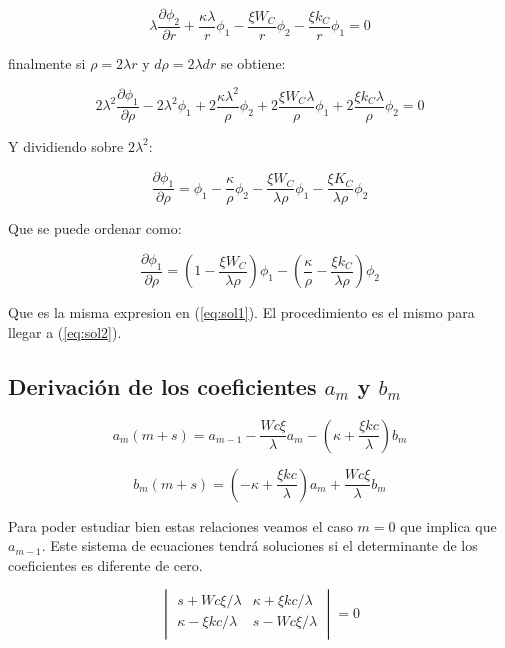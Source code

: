 \documentclass[a4paper, 12pt]{article} %
\begin{document}
\begin{equation}
\lambda \dfrac{\partial \phi_2}{\partial r}  + \dfrac{\kappa \lambda}{r} \phi_1  - \dfrac{\xi W_C}{r} \phi_2 - \dfrac{\xi k_C}{r} \phi_1 = 0
\end{equation}

finalmente si $\rho = 2\lambda r$ y $d\rho = 2 \lambda dr$ se obtiene:

\[
2\lambda^2 \dfrac{\partial \phi_1}{\partial \rho} - 2\lambda^2 \phi_1 + 2 \dfrac{\kappa \lambda^2 }{\rho} \phi_2 
+ 2 \dfrac{\xi W_C \lambda}{\rho}\phi_1 + 2\dfrac{\xi k_C \lambda }{\rho}\phi_2 = 0
\]

Y dividiendo sobre $2\lambda^2$:

\[
\dfrac{\partial \phi_1}{\partial \rho} = \phi_1 - \dfrac{\kappa}{\rho}\phi_2 - \dfrac{\xi W_C}{\lambda \rho }\phi_1 - \dfrac{\xi K_C}{\lambda \rho}
\phi_2 
\]

Que se puede ordenar como:

\begin{equation}
\dfrac{\partial \phi_1}{\partial \rho} = \left( 1 - \dfrac{\xi W_C}{\lambda \rho} \right) \phi_1 
- \left( \dfrac{\kappa}{\rho} - \dfrac{\xi k_C}{\lambda \rho} \right) \phi_2
\end{equation}

Que es la misma expresion en (\ref{eq:sol1}). El procedimiento es el mismo para llegar a (\ref{eq:sol2}).

\subsection{Derivaci\'on de los coeficientes $a_m$ y $b_m$}

\begin{equation}\label{eq:am}
a_m(m+s) = a_{m-1} - \dfrac{Wc\xi}{\lambda}a_m - \left(\kappa + \dfrac{\xi kc}{\lambda}\right) b_m
\end{equation}

\begin{equation}\label{eq:bm}
b_m(m+s) = \left( -\kappa + \dfrac{\xi kc}{\lambda}  \right)a_m + \dfrac{Wc \xi}{\lambda}b_m
\end{equation}

Para poder estudiar bien estas relaciones veamos el caso $m=0$ que implica que $a_{m-1}$. Este 
sistema de ecuaciones tendr\'a soluciones si el determinante de los coeficientes es diferente de
cero. 

\[
\begin{vmatrix}
s + Wc \xi/\lambda & \kappa + \xi kc/\lambda \\
\kappa - \xi kc/\lambda & s-Wc \xi/\lambda \\
\end{vmatrix}
= 0
\]
\end{document}
